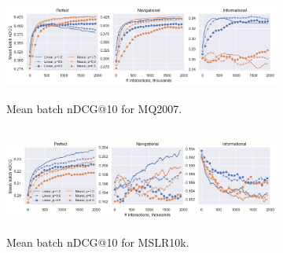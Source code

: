 \begin{figure}[t]
	\centering
	\begin{subfigure}{1\textwidth}
		\includegraphics[width=13cm, height=3.5cm]{images/RQ4/mq2007_foltr_online nDCG_both_c2000_ps.png}
		\caption{Mean batch nDCG@10 for MQ2007.}
		\label{fig:mq2007-rq4}
	\end{subfigure}
	\begin{subfigure}{1\textwidth}
		\includegraphics[width=13cm, height=3.5cm]{images/RQ4/mslr10k_foltr_online nDCG_both_c2000_ps.png}
		\caption{Mean batch nDCG@10 for MSLR10k.}
		\label{fig:mslr10k-rq4}
	\end{subfigure}
	\caption{{\color{red}{Results for RQ4: performance of FOLtR-ES in terms of online nDCG@10 computed using relevance labels and the SERPs used for obtaining user iterations (averaged across all dataset splits).}} \label{fig:RQ4}} 
\end{figure}

